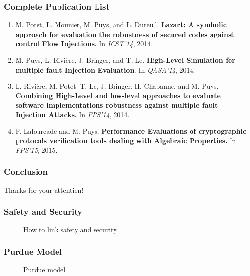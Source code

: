 \documentclass{beamer}
\begin{document}
\begin{frame}
    \frametitle{Complete Publication List}

    \begin{enumerate}
        \item M. Potet, L. Mounier, M. Puys, and L. Dureuil. {\bf Lazart: A symbolic approach for evaluation the robustness of secured codes against control Flow Injections.} In {\em ICST'14}, 2014.
            \vfill
        \item M. Puys, L. Rivi\`ere, J. Bringer, and T. Le. {\bf High-Level Simulation for multiple fault Injection Evaluation.} In {\em QASA'14}, 2014.
            \vfill
        \item L. Rivi\`ere, M. Potet, T. Le, J. Bringer, H. Chabanne, and M. Puys. {\bf Combining High-Level and low-level approaches to evaluate software implementations robustness against multiple fault Injection Attacks.} In {\em FPS'14}, 2014.
            \vfill
        \item P. Lafourcade and M. Puys. {\bf Performance Evaluations of cryptographic protocols verification tools dealing with Algebraic Properties.} In {\em FPS'15}, 2015.
    \end{enumerate}
\end{frame}

\begin{frame}
    \frametitle{Conclusion}

    \begin{center}
        Thanks for your attention!
    \end{center}
\end{frame}

\begin{frame}
    \frametitle{Safety and Security}
    
    \begin{figure}[htb]
        \resizebox{.6\columnwidth}{!}{
            
        }
        \caption{How to link safety and security \cite{Pie10}}
    \end{figure}
\end{frame}

\begin{frame}
    \frametitle{Purdue Model}

    \begin{figure}[htb]
        \resizebox{.8\columnwidth}{!}{
            
        }

        \caption{Purdue model \cite{Wil91}}
    \end{figure}
\end{frame}
\end{document}
